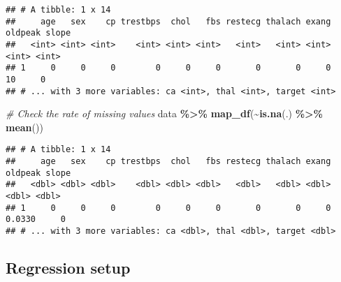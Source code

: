 \documentclass[
]{book}
\newenvironment{Shaded}{\begin{snugshade}}{\end{snugshade}}
\newcommand{\CommentTok}[1]{\textcolor[rgb]{0.56,0.35,0.01}{\textit{#1}}}
\newcommand{\DataTypeTok}[1]{\textcolor[rgb]{0.13,0.29,0.53}{#1}}
\newcommand{\DecValTok}[1]{\textcolor[rgb]{0.00,0.00,0.81}{#1}}
\newcommand{\KeywordTok}[1]{\textcolor[rgb]{0.13,0.29,0.53}{\textbf{#1}}}
\newcommand{\NormalTok}[1]{#1}
\newcommand{\OperatorTok}[1]{\textcolor[rgb]{0.81,0.36,0.00}{\textbf{#1}}}
\newcommand{\OtherTok}[1]{\textcolor[rgb]{0.56,0.35,0.01}{#1}}
\newcommand{\StringTok}[1]{\textcolor[rgb]{0.31,0.60,0.02}{#1}}
\begin{document}
\begin{Shaded}
\end{Shaded}

\begin{verbatim}
## # A tibble: 1 x 14
##     age   sex    cp trestbps  chol   fbs restecg thalach exang oldpeak slope
##   <int> <int> <int>    <int> <int> <int>   <int>   <int> <int>   <int> <int>
## 1     0     0     0        0     0     0       0       0     0      10     0
## # ... with 3 more variables: ca <int>, thal <int>, target <int>
\end{verbatim}

\begin{Shaded}
\begin{Highlighting}[]
\CommentTok{\# Check the rate of missing values}
\NormalTok{data }\OperatorTok{\%\textgreater{}\%}
\StringTok{  }\KeywordTok{map\_df}\NormalTok{(}\OperatorTok{\textasciitilde{}}\KeywordTok{is.na}\NormalTok{(.) }\OperatorTok{\%\textgreater{}\%}\StringTok{ }\KeywordTok{mean}\NormalTok{())}
\end{Highlighting}
\end{Shaded}

\begin{verbatim}
## # A tibble: 1 x 14
##     age   sex    cp trestbps  chol   fbs restecg thalach exang oldpeak slope
##   <dbl> <dbl> <dbl>    <dbl> <dbl> <dbl>   <dbl>   <dbl> <dbl>   <dbl> <dbl>
## 1     0     0     0        0     0     0       0       0     0  0.0330     0
## # ... with 3 more variables: ca <dbl>, thal <dbl>, target <dbl>
\end{verbatim}

\hypertarget{regression-setup}{%
\subsection{Regression setup}\label{regression-setup}}
\end{document}
